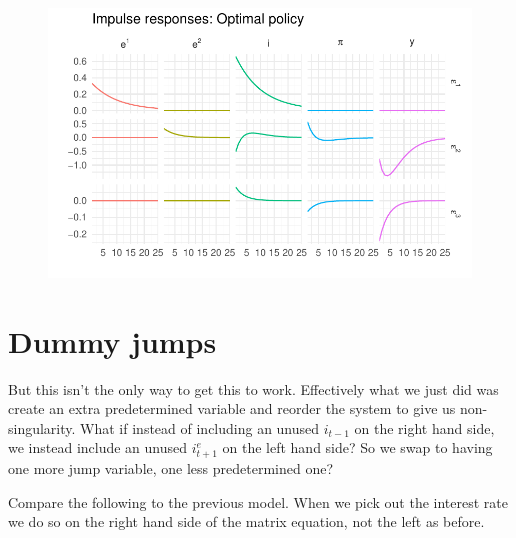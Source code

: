 \documentclass[
  letterpaper,
]{book}
\begin{document}
\begin{figure}[H]

{\centering \includegraphics{BK_files/figure-pdf/unnamed-chunk-24-1.pdf}

}

\end{figure}

\hypertarget{dummy-jumps}{%
\section{Dummy jumps}\label{dummy-jumps}}

But this isn't the only way to get this to work. Effectively what we
just did was create an extra predetermined variable and reorder the
system to give us non-singularity. What if instead of including an
unused \(i_{t-1}\) on the right hand side, we instead include an unused
\(i^e_{t+1}\) on the left hand side? So we swap to having one more jump
variable, one less predetermined one?

Compare the following to the previous model. When we pick out the
interest rate we do so on the right hand side of the matrix equation,
not the left as before.
\end{document}
